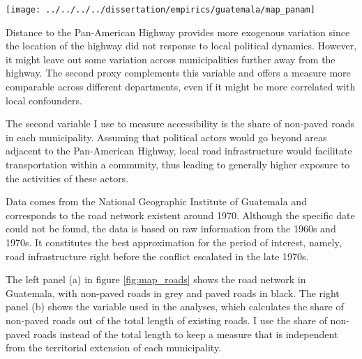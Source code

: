 \documentclass[12pt, notitlepage]{article}
\begin{document}
\begin{figure*}[htb!]
  \centering
    \texttt{[image: ../../../../dissertation/empirics/guatemala/map\_panam]}

  \caption{Distance to Pan-American Highway} \label{fig:map_panam}

\end{figure*}

Distance to the Pan-American Highway provides more exogenous variation since the location of the highway did not response to local political dynamics.
However, it might leave out some variation across municipalities further away from the highway.
The second proxy complements this variable and offers a measure more comparable across different departments, even if it might be more correlated with local confounders.

The second variable I use to measure accessibility is the share of non-paved roads in each municipality.
Assuming that political actors would go beyond areas adjacent to the Pan-American Highway, local road infrastructure would facilitate transportation within a community, thus leading to generally higher exposure to the activities of these actors.

Data comes from the National Geographic Institute of Guatemala \citep{Segeplan:2019aa} and corresponds to the road network existent around 1970.
Although the specific date could not be found, the data is based on raw information from the 1960s and 1970s.
It constitutes the best approximation for the period of interest, namely, road infrastructure right before the conflict escalated in the late 1970s.

The left panel (a) in figure \ref{fig:map_roads} shows the road network in Guatemala, with non-paved roads in grey and paved roads in black.
The right panel (b) shows the variable used in the analyses, which calculates the share of non-paved roads out of the total length of existing roads.
I use the share of non-paved roads instead of the total length to keep a measure that is independent from the territorial extension of each municipality.

\begin{figure*}[!ht]
    \centering

    \begin{minipage}{1\textwidth}
      \centering
      \hspace{25pt}
    \end{minipage}

    \caption{Local road infrastructure} \label{fig:map_roads}

\end{figure*}
\end{document}
